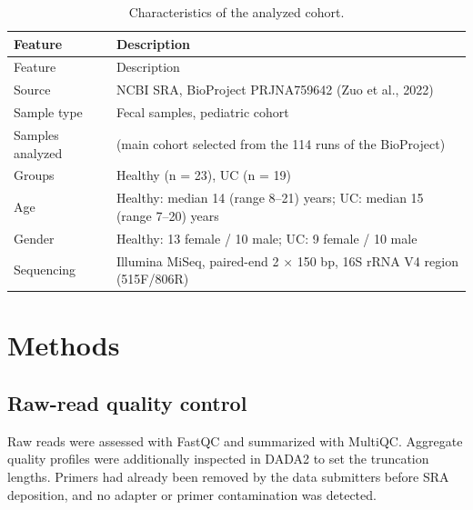 \documentclass[
  letterpaper,
  DIV=11,
  numbers=noendperiod]{scrartcl}
\begin{document}
\begin{longtable}[]{@{}
  >{\raggedright\arraybackslash}p{}
  >{\raggedright\arraybackslash}p{}@{}}
\caption{Characteristics of the analyzed
cohort.}\label{tbl-cohort}\tabularnewline
\toprule\noalign{}
\begin{minipage}[b]{\linewidth}\raggedright
Feature
\end{minipage} & \begin{minipage}[b]{\linewidth}\raggedright
Description
\end{minipage} \\
\midrule\noalign{}
\endfirsthead
\toprule\noalign{}
\begin{minipage}[b]{\linewidth}\raggedright
Feature
\end{minipage} & \begin{minipage}[b]{\linewidth}\raggedright
Description
\end{minipage} \\
\midrule\noalign{}
\endhead
\bottomrule\noalign{}
\endlastfoot
Source & NCBI SRA, BioProject PRJNA759642 (Zuo et al., 2022) \\
Sample type & Fecal samples, pediatric cohort \\
Samples analyzed & 42 (main cohort selected from the 114 runs of the
BioProject) \\
Groups & Healthy (n = 23), UC (n = 19) \\
Age & Healthy: median 14 (range 8--21) years; UC: median 15 (range
7--20) years \\
Gender & Healthy: 13 female / 10 male; UC: 9 female / 10 male \\
Sequencing & Illumina MiSeq, paired-end 2 × 150 bp, 16S rRNA V4 region
(515F/806R) \\
\end{longtable}

\section{Methods}\label{methods}

\subsection{Raw-read quality control}\label{raw-read-quality-control}

Raw reads were assessed with FastQC and summarized with MultiQC.
Aggregate quality profiles were additionally inspected in DADA2 to set
the truncation lengths. Primers had already been removed by the data
submitters before SRA deposition, and no adapter or primer contamination
was detected.
\end{document}
